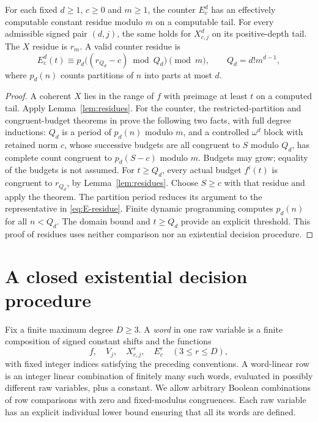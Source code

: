 \documentclass[11pt]{article}
\begin{document}
\begin{lemma}\label{lem:kernel-residues}
For each fixed $d\ge1$, $c\ge0$ and $m\ge1$, the counter $E^d_c$
has an effectively computable constant residue modulo $m$ on a computable
tail. For every admissible signed pair $(d,j)$, the same holds for
$X^d_{c,j}$ on its positive-depth tail. The $X$
residue is $r_m$. A valid counter residue is
\begin{equation}\label{eq:E-residue}
 E^d_c(t)\equiv
 p_d\bigl((r_{Q_d}-c)\bmod Q_d\bigr)\pmod m,
 \qquad Q_d=d!m^{d-1},
\end{equation}
where $p_d(n)$ counts partitions of $n$ into parts at most $d$.
\end{lemma}
\begin{proof}
A coherent $X$ lies in the range of $f$ with preimage at least $t$ on a
computed tail. Apply Lemma~\ref{lem:residues}.
For the counter, the restricted-partition and congruent-budget theorems
in \cite{wwcounts} prove the following two facts, with full degree
inductions: $Q_d$ is a period of $p_d(n)$ modulo $m$, and a controlled
$\omega^d$ block with retained norm $c$, whose successive budgets are all
congruent to $S$ modulo $Q_d$, has complete count congruent to
$p_d(S-c)$ modulo $m$. Budgets may grow; equality of the budgets is not
assumed. For $t\ge Q_d$, every actual budget $f^{i}(t)$ is congruent to
$r_{Q_d}$, by Lemma~\ref{lem:residues}. Choose $S\ge c$ with that residue
and apply the theorem. The partition period reduces its argument to the
representative in \eqref{eq:E-residue}. Finite dynamic programming computes
$p_d(n)$ for all $n<Q_d$. The domain bound and $t\ge Q_d$ provide an
explicit threshold. This proof of residues uses neither comparison nor
an existential decision procedure.
\end{proof}

\section{A closed existential decision procedure}
Fix a finite maximum degree $D\ge3$. A \emph{word} in one raw variable
is a finite composition of signed constant shifts and the functions
\[
 f,\quad V_j,\quad X^r_{c,j},\quad E^r_c\quad(3\le r\le D),
\]
with fixed integer indices satisfying the preceding conventions. A
word-linear row is an integer linear combination of finitely many such
words, evaluated in possibly different raw variables, plus a constant.
We allow arbitrary Boolean combinations of row comparisons with zero and
fixed-modulus congruences. Each raw variable has an explicit individual
lower bound ensuring that all its words are defined.
\end{document}
